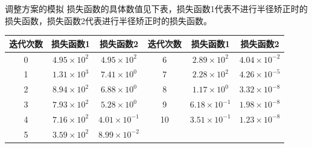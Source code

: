 \documentclass[aspectratio=169]{beamer}
\begin{document}
\begin{frame}{调整方案的模拟}
    损失函数的具体数值见下表，损失函数1代表不进行半径矫正时的损失函数，损失函数2代表进行半径矫正时的损失函数。
    \begin{table}[!ht]
        \centering
        \begin{tabular}{ccc|ccc}
            \toprule
            迭代次数 & 损失函数1 & 损失函数2 & 迭代次数 & 损失函数1 & 损失函数2 \\ 
            \midrule
            0 & $4.95\times 10^2$ & $4.95\times 10^2$ & 6 & $2.89\times 10^2$ & $4.04\times 10^{-2}$ \\ 
            1 & $1.31\times 10^3$ & $7.41\times 10^0$ & 7 & $2.28\times 10^2$ & $4.26\times 10^{-5}$ \\ 
            2 & $8.94\times 10^2$ & $6.88\times 10^0$ & 8 & $1.17\times 10^0$ & $3.32\times 10^{-8}$ \\ 
            3 & $7.93\times 10^2$ & $5.28\times 10^0$ & 9 & $6.18\times 10^{-1}$ & $1.98\times 10^{-8}$ \\ 
            4 & $7.16\times 10^2$ & $4.01\times 10^{-1}$ & 10 & $3.51\times 10^{-1}$ & $1.23\times 10^{-8}$ \\ 
            5 & $3.59\times 10^2$ & $8.99\times 10^{-2}$ \\ 
            \bottomrule
        \end{tabular}
    \end{table}
\end{frame}
\end{document}
